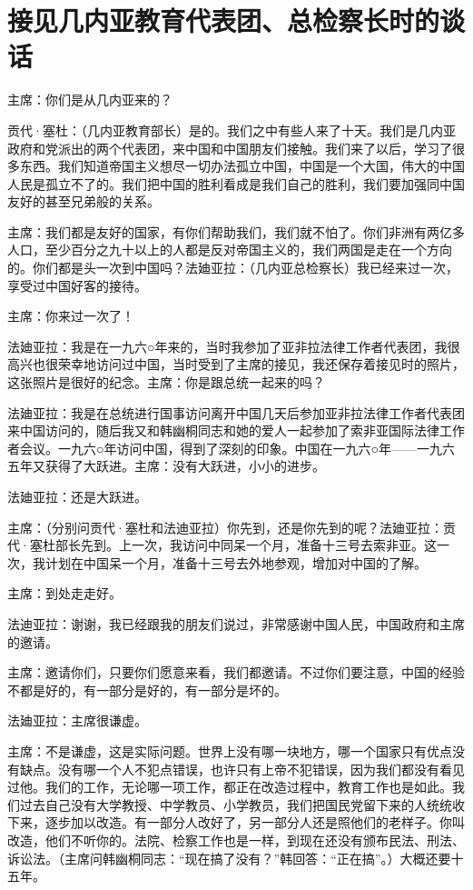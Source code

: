\section[接见几内亚教育代表团、总检察长时的谈话（一九六五年八月八日）]{接见几内亚教育代表团、总检察长时的谈话}


主席：你们是从几内亚来的？

贡代·塞杜：（几内亚教育部长）是的。我们之中有些人来了十天。我们是几内亚政府和党派出的两个代表团，来中国和中国朋友们接触。我们来了以后，学习了很多东西。我们知道帝国主义想尽一切办法孤立中国，中国是一个大国，伟大的中国人民是孤立不了的。我们把中国的胜利看成是我们自己的胜利，我们要加强同中国友好的甚至兄弟般的关系。

主席：我们都是友好的国家，有你们帮助我们，我们就不怕了。你们非洲有两亿多人口，至少百分之九十以上的人都是反对帝国主义的，我们两国是走在一个方向的。你们都是头一次到中国吗？法廸亚拉：（几内亚总检察长）我已经来过一次，享受过中国好客的接待。

主席：你来过一次了！

法廸亚拉：我是在一九六○年来的，当时我参加了亚非拉法律工作者代表团，我很高兴也很荣幸地访问过中国，当时受到了主席的接见，我还保存着接见时的照片，这张照片是很好的纪念。主席：你是跟总统一起来的吗？

法廸亚拉：我是在总统进行国事访问离开中国几天后参加亚非拉法律工作者代表团来中国访问的，随后我又和韩幽桐同志和她的爱人一起参加了索非亚国际法律工作者会议。一九六○年访问中国，得到了深刻的印象。中国在一九六○年——一九六五年又获得了大跃进。主席：没有大跃进，小小的进步。

法廸亚拉：还是大跃进。

主席：（分别问贡代·塞杜和法迪亚拉）你先到，还是你先到的呢？法廸亚拉：贡代·塞杜部长先到。上一次，我访问中同呆一个月，准备十三号去索非亚。这一次，我计划在中国呆一个月，准备十三号去外地参观，增加对中国的了解。

主席：到处走走好。

法迪亚拉：谢谢，我已经跟我的朋友们说过，非常感谢中国人民，中国政府和主席的邀请。

主席：邀请你们，只要你们愿意来看，我们都邀请。不过你们要注意，中国的经验不都是好的，有一部分是好的，有一部分是坏的。

法廸亚拉：主席很谦虚。

主席：不是谦虚，这是实际问题。世界上没有哪一块地方，哪一个国家只有优点没有缺点。没有哪一个人不犯点错误，也许只有上帝不犯错误，因为我们都没有看见过他。我们的工作，无论哪一项工作，都正在改造过程中，教育工作也是如此。我们过去自己没有大学教授、中学教员、小学教员，我们把国民党留下来的人统统收下来，逐步加以改造。有一部分人改好了，另一部分人还是照他们的老样子。你叫改造，他们不听你的。法院、检察工作也是一样，到现在还没有颁布民法、刑法、诉讼法。（主席问韩幽桐同志：“现在搞了没有？”韩回答：“正在搞”。）大概还要十五年。

